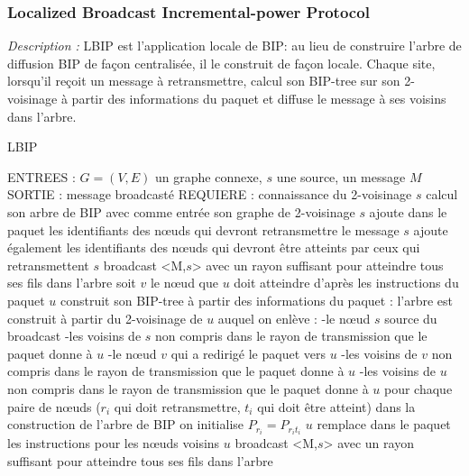 \subsubsection{Localized Broadcast Incremental-power Protocol  \cite{Ingelrest2008}}

\emph{Description :} LBIP est l'application locale de BIP: au lieu de construire l'arbre de diffusion BIP de façon centralisée, il le construit de façon locale.
Chaque site, lorsqu'il reçoit un message à retransmettre, calcul son BIP-tree sur son 2-voisinage à partir des informations du paquet et diffuse le message à ses voisins dans l'arbre.


\begin{algorithm}[H]
\caption{LBIP}
\label{algo_LBIP}
\begin{algorithmic}
\STATE ENTREES : $G=(V,E)$ un graphe connexe, $s$ une source, un message $M$
\STATE SORTIE : message broadcasté
\STATE REQUIERE : connaissance du 2-voisinage
\STATE $s$ calcul son arbre de BIP avec comme entrée son graphe de 2-voisinage
\STATE $s$ ajoute dans le paquet les identifiants des nœuds qui devront retransmettre le message
\STATE $s$ ajoute également les identifiants des nœuds qui devront être atteints par ceux qui retransmettent
\STATE $s$ broadcast <M,$s$> avec un rayon suffisant pour atteindre tous ses fils dans l'arbre
		\STATE soit $v$ le nœud que $u$ doit atteindre d'après les instructions du paquet
		\STATE $u$ construit son BIP-tree à partir des informations du paquet :
			 \INDSTATE l'arbre est construit à partir du 2-voisinage de $u$ auquel on enlève :
			 	 \INDSTATE[2]-le nœud $s$ source du broadcast
				 \INDSTATE[2]-les voisins de $s$ non compris dans le rayon de transmission que le paquet donne à $u$
				 \INDSTATE[2]-le nœud $v$ qui a redirigé le paquet vers $u$
				 \INDSTATE[2]-les voisins de $v$ non compris dans le rayon de transmission que le paquet donne à $u$
				 \INDSTATE[2]-les voisins de $u$ non compris dans le rayon de transmission que le paquet donne à $u$
			\INDSTATE[1] pour chaque paire de nœuds ($r_i$ qui doit retransmettre, $t_i$ qui doit être atteint)
				\INDSTATE[2] dans la construction de l'arbre de BIP on initialise $P_{r_i} = P_{r_i t_i}$
			\INDSTATE[1] $u$ remplace dans le paquet les instructions pour les nœuds voisins
			\INDSTATE[1] $u$ broadcast <M,$s$> avec un rayon suffisant pour atteindre tous ses fils dans l'arbre
	\ENDIF
\ENDIF
\end{algorithmic}
\end{algorithm}



